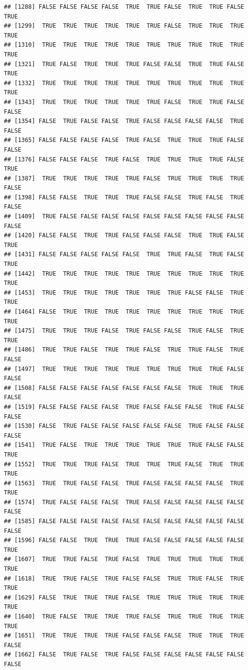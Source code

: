 \documentclass{article}\usepackage[]{graphicx}\usepackage[]{color}
\makeatletter
\newenvironment{kframe}{%
 \def\at@end@of@kframe{}%
 \ifinner\ifhmode%
  \def\at@end@of@kframe{\end{minipage}}%
  \begin{minipage}{\columnwidth}%
 \fi\fi%
 \def\FrameCommand##1{\hskip\@totalleftmargin \hskip-\fboxsep
 \colorbox{shadecolor}{##1}\hskip-\fboxsep
     \hskip-\linewidth \hskip-\@totalleftmargin \hskip\columnwidth}%
 \MakeFramed {\advance\hsize-\width
   \@totalleftmargin\z@ \linewidth\hsize
   \@setminipage}}%
 {\par\unskip\endMakeFramed%
 \at@end@of@kframe}
\newenvironment{knitrout}{}{} %
\makeatother
\begin{document}
\begin{knitrout}
\begin{kframe}
\begin{verbatim}
## [1288] FALSE FALSE FALSE FALSE  TRUE  TRUE FALSE  TRUE  TRUE FALSE  TRUE
## [1299]  TRUE  TRUE  TRUE  TRUE  TRUE  TRUE FALSE  TRUE  TRUE  TRUE  TRUE
## [1310]  TRUE  TRUE  TRUE  TRUE  TRUE  TRUE  TRUE  TRUE  TRUE  TRUE  TRUE
## [1321]  TRUE FALSE  TRUE  TRUE  TRUE FALSE FALSE  TRUE  TRUE FALSE  TRUE
## [1332]  TRUE  TRUE  TRUE  TRUE  TRUE  TRUE  TRUE  TRUE  TRUE  TRUE  TRUE
## [1343]  TRUE  TRUE  TRUE  TRUE  TRUE  TRUE FALSE  TRUE  TRUE FALSE FALSE
## [1354] FALSE  TRUE FALSE FALSE  TRUE FALSE FALSE FALSE FALSE  TRUE FALSE
## [1365] FALSE FALSE FALSE FALSE  TRUE FALSE  TRUE  TRUE  TRUE FALSE FALSE
## [1376] FALSE FALSE FALSE  TRUE FALSE  TRUE  TRUE  TRUE  TRUE FALSE  TRUE
## [1387]  TRUE  TRUE  TRUE  TRUE  TRUE FALSE  TRUE  TRUE  TRUE  TRUE FALSE
## [1398] FALSE FALSE  TRUE  TRUE  TRUE FALSE FALSE  TRUE FALSE  TRUE FALSE
## [1409]  TRUE FALSE FALSE FALSE FALSE FALSE FALSE FALSE FALSE FALSE FALSE
## [1420] FALSE FALSE  TRUE  TRUE FALSE FALSE FALSE  TRUE  TRUE FALSE  TRUE
## [1431] FALSE FALSE FALSE FALSE FALSE  TRUE  TRUE FALSE  TRUE FALSE  TRUE
## [1442]  TRUE  TRUE  TRUE  TRUE  TRUE  TRUE  TRUE  TRUE  TRUE  TRUE  TRUE
## [1453]  TRUE  TRUE  TRUE  TRUE  TRUE  TRUE  TRUE FALSE FALSE  TRUE  TRUE
## [1464] FALSE  TRUE  TRUE  TRUE  TRUE  TRUE  TRUE  TRUE  TRUE  TRUE  TRUE
## [1475]  TRUE  TRUE  TRUE FALSE  TRUE FALSE FALSE  TRUE FALSE  TRUE  TRUE
## [1486]  TRUE  TRUE FALSE  TRUE  TRUE FALSE  TRUE  TRUE FALSE  TRUE FALSE
## [1497]  TRUE  TRUE  TRUE  TRUE  TRUE  TRUE  TRUE  TRUE  TRUE FALSE FALSE
## [1508] FALSE FALSE FALSE FALSE FALSE FALSE FALSE  TRUE  TRUE  TRUE FALSE
## [1519] FALSE FALSE FALSE FALSE  TRUE FALSE FALSE FALSE  TRUE FALSE FALSE
## [1530] FALSE  TRUE FALSE FALSE FALSE FALSE FALSE  TRUE FALSE FALSE FALSE
## [1541]  TRUE FALSE  TRUE  TRUE  TRUE  TRUE  TRUE  TRUE FALSE FALSE  TRUE
## [1552]  TRUE  TRUE  TRUE FALSE  TRUE  TRUE  TRUE FALSE  TRUE  TRUE  TRUE
## [1563]  TRUE  TRUE FALSE FALSE  TRUE FALSE FALSE FALSE FALSE  TRUE  TRUE
## [1574]  TRUE FALSE FALSE FALSE  TRUE FALSE FALSE FALSE FALSE FALSE FALSE
## [1585] FALSE FALSE FALSE FALSE FALSE FALSE FALSE FALSE FALSE FALSE FALSE
## [1596] FALSE FALSE  TRUE  TRUE  TRUE FALSE FALSE FALSE FALSE FALSE  TRUE
## [1607]  TRUE  TRUE FALSE  TRUE FALSE  TRUE  TRUE  TRUE  TRUE  TRUE  TRUE
## [1618]  TRUE  TRUE FALSE  TRUE FALSE FALSE  TRUE  TRUE FALSE  TRUE  TRUE
## [1629] FALSE  TRUE  TRUE  TRUE FALSE  TRUE  TRUE  TRUE  TRUE  TRUE  TRUE
## [1640]  TRUE FALSE  TRUE  TRUE  TRUE FALSE  TRUE  TRUE  TRUE  TRUE  TRUE
## [1651]  TRUE  TRUE  TRUE  TRUE FALSE FALSE FALSE  TRUE  TRUE  TRUE FALSE
## [1662] FALSE  TRUE FALSE  TRUE FALSE FALSE FALSE FALSE FALSE FALSE FALSE

\end{verbatim}
\end{kframe}
\end{knitrout}
\end{document}
